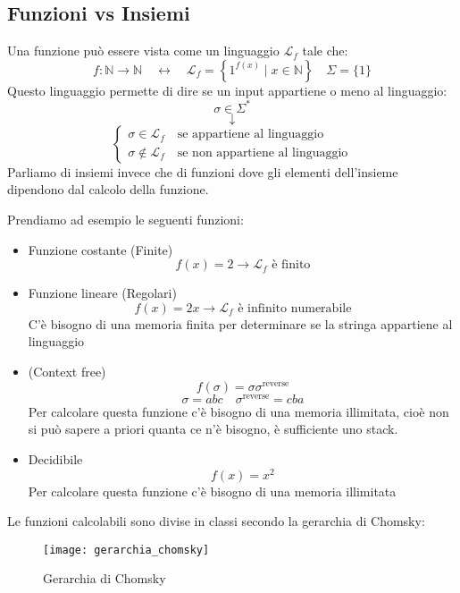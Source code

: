 \documentclass[a4paper]{article}
\begin{document}
\subsection{Funzioni vs Insiemi}
Una funzione può essere vista come un linguaggio \( \mathcal{L}_f \) tale che:
\[
  f: \mathbb{N} \to \mathbb{N} \quad \leftrightarrow \quad
  \mathcal{L}_f = \left\{ 1^{f(x)} \;\left|\; x \in \mathbb{N} \right.\right\} \quad
  \Sigma = \{1\}
\] 
Questo linguaggio permette di dire se un input appartiene o meno al linguaggio:
\[
  \sigma  \in \Sigma^*
\] 
\[
  \downarrow
\] 
\[
  \begin{cases}
    \sigma  \in \mathcal{L}_f \quad \text{se appartiene al linguaggio}\\
    \sigma  \notin \mathcal{L}_f \quad \text{se non appartiene al linguaggio}
  \end{cases}
\] 
Parliamo di insiemi invece che di funzioni dove gli elementi dell'insieme dipendono dal
calcolo della funzione.
\begin{example}
  Prendiamo ad esempio le seguenti funzioni:
  \begin{itemize}
    \item Funzione costante (Finite)
      \[
        f(x) = 2 \to \mathcal{L}_f \text{ è finito}
      \] 
    \item Funzione lineare (Regolari)
      \[
        f(x) = 2x \to \mathcal{L}_f \text{ è infinito numerabile}
      \]
      C'è bisogno di una memoria finita per determinare se la stringa appartiene al linguaggio
    \item (Context free)
      \[
        f(\sigma) = \sigma \sigma^{\text{reverse}}
      \] 
      \[
        \sigma = abc \quad \sigma^\text{reverse} = cba
      \] 
      Per calcolare questa funzione c'è bisogno di una memoria illimitata, cioè non
      si può sapere a priori quanta ce n'è bisogno, è sufficiente uno stack.

    \item Decidibile
      \[
        f(x) = x^2
      \] 
      Per calcolare questa funzione c'è bisogno di una memoria illimitata
  \end{itemize}
\end{example}

\vspace{1em}
\noindent
Le funzioni calcolabili sono divise in classi secondo la gerarchia di Chomsky:
\begin{figure}[H]
  \centering
  \texttt{[image: gerarchia\_chomsky]}
  \caption{Gerarchia di Chomsky}
\end{figure}
\end{document}
